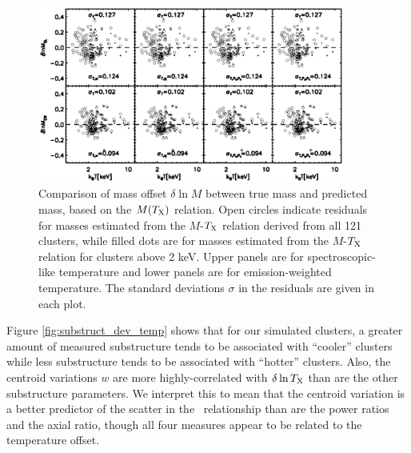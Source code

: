 \documentclass{aastex} \usepackage{natbib}
\begin{document}
\begin{figure}[b]
  \centering
  \includegraphics[width=0.9\textwidth]{f10.eps}
  \caption{Comparison of mass offset $\delta \ln M$ between true mass
    and predicted mass, based on the $M(T_{\rm X})$ relation.  Open circles
    indicate residuals for masses estimated from the $M$-$T_{\rm X}$
    relation derived from all 121 clusters, while filled dots are for
    masses estimated from the $M$-$T_{\rm X}$ relation for clusters
    above 2 keV.  Upper panels are for spectroscopic-like temperature
    and lower panels are for emission-weighted temperature.  The
    standard deviations $\sigma$ in the residuals are given in each
    plot.}
  \label{fig:resid_lowt}
\end{figure}

Figure \ref{fig:substruct_dev_temp} shows that for our simulated
clusters, a greater amount of measured substructure tends to be
associated with ``cooler'' clusters while less substructure tends to
be associated with ``hotter'' clusters.  Also, the centroid variations
$w$ are more highly-correlated with $\delta \ln T_{\rm X}$ than are the
other substructure parameters.  We interpret this to mean that the
centroid variation is a better predictor of the scatter in the \mtx\
relationship than are the power ratios and the axial ratio, though all
four measures appear to be related to the temperature offset.
\end{document}
